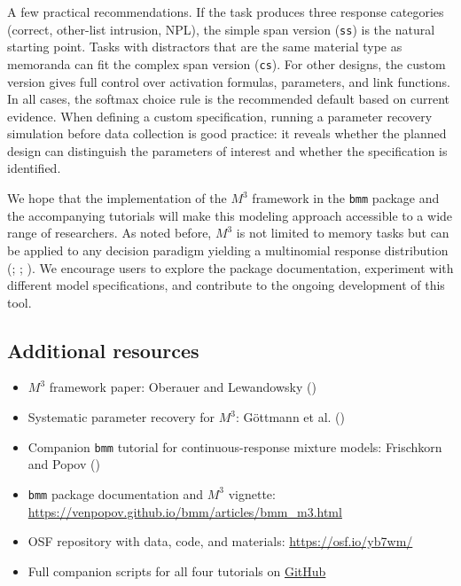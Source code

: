 \documentclass[
  man,
  floatsintext,
  longtable,
  nolmodern,
  notxfonts,
  notimes,
  colorlinks=true,linkcolor=blue,citecolor=blue,urlcolor=blue]{apa7}
\providecommand{\tightlist}{%
  \setlength{\itemsep}{0pt}\setlength{\parskip}{0pt}}
\begin{document}
A few practical recommendations. If the task produces three response
categories (correct, other-list intrusion, NPL), the simple span version
(\texttt{ss}) is the natural starting point. Tasks with distractors that
are the same material type as memoranda can fit the complex span version
(\texttt{cs}). For other designs, the custom version gives full control
over activation formulas, parameters, and link functions. In all cases,
the softmax choice rule is the recommended default based on current
evidence. When defining a custom specification, running a parameter
recovery simulation before data collection is good practice: it reveals
whether the planned design can distinguish the parameters of interest
and whether the specification is identified.

We hope that the implementation of the \(M^3\) framework in the
\texttt{bmm} package and the accompanying tutorials will make this
modeling approach accessible to a wide range of researchers. As noted
before, \(M^3\) is not limited to memory tasks but can be applied to any
decision paradigm yielding a multinomial response distribution
(;
;
). We encourage
users to explore the package documentation, experiment with different
model specifications, and contribute to the ongoing development of this
tool.

\subsection{Additional resources}\label{additional-resources}

\begin{itemize}
\tightlist
\item
  \(M^3\) framework paper: Oberauer and Lewandowsky
  ()
\item
  Systematic parameter recovery for \(M^3\): Göttmann et al.
  ()
\item
  Companion \texttt{bmm} tutorial for continuous-response mixture
  models: Frischkorn and Popov
  ()
\item
  \texttt{bmm} package documentation and \(M^3\) vignette:
  \url{https://venpopov.github.io/bmm/articles/bmm_m3.html}
\item
  OSF repository with data, code, and materials:
  \url{https://osf.io/yb7wm/}
\item
  Full companion scripts for all four tutorials on
  \href{https://github.com/GidonFrischkorn/tutorial-m3-bmm}{GitHub}
\end{itemize}
\end{document}
